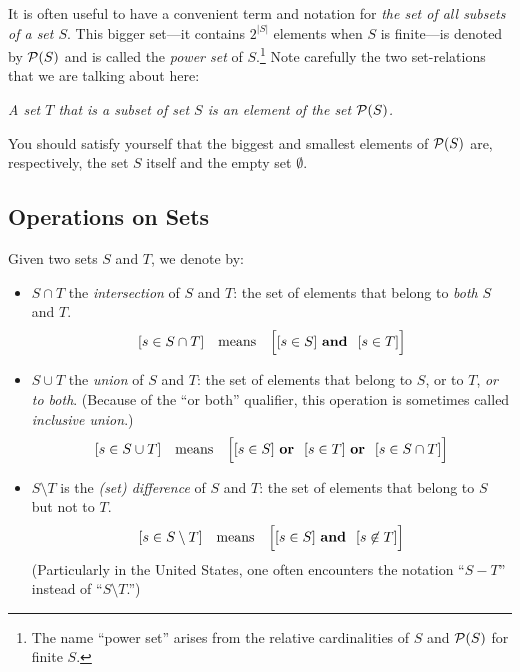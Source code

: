 It is often useful to have a convenient term and notation for {\em the
  set of all subsets of a set $S$}.  This bigger set---it contains
$2^{|S|}$ elements when $S$ is finite---is denoted by $\mbox{$\cal P$}(S)$ and is
called the {\em power set} of
$S$.\footnote{The name ``power set'' arises from the relative
  cardinalities of $S$ and ${\cal P}(S)$ for finite $S$.}  Note
carefully the two set-relations that we are talking about here:

{\em A set $T$ that is a {\em subset} of set $S$ is an {\em element}
  of the set $\mbox{$\cal P$}(S)$.}

\noindent
You should satisfy yourself that the biggest and smallest elements of
${\cal P}(S)$ are, respectively, the set $S$ itself and the empty set
$\emptyset$.

\subsection{Operations on Sets}
\label{sec:set-operations}

Given two sets $S$ and $T$, we denote by:
\begin{itemize}
\item
$S \cap T$ the {\it
  intersection}
of $S$ and $T$: the set of elements that belong to {\em both} $S$ and
$T$.
\[ [s \in S \cap T] \ \ \mbox{ means } \ \ 
\Big[ [s \in S] \ \mbox{\bf and } \ [s \in T] \Big]
\]

\item
$S \cup T$ the {\it
  union}
of $S$ and $T$: the set of elements that belong to $S$, or to $T$, {\em
  or to both}.  (Because of the ``or both'' qualifier, this operation
is sometimes called {\em inclusive
  union}.)
\[ [s \in S \cup T] \ \ \mbox{ means } \ \
\Big[ [s \in S] \ \mbox{\bf or } \ [s \in T]  \ \mbox{\bf or } \ [s
    \in S \cap T] \Big]
\]


\item
$S \setminus T$ is the {\em
  (set) difference} of $S$ and
  $T$: the set of elements that belong to $S$ but not to $T$.
\[ [s \in S \setminus T] \ \ \mbox{ means } \ \
\Big[ [s \in S] \ \mbox{\bf and } \ [s \not\in T] \Big]
\]
(Particularly in the United States, one often encounters the notation
 ``$S-T$''\index{$S - T$: set difference} instead of ``$S \setminus
 T$.'')
\end{itemize}


